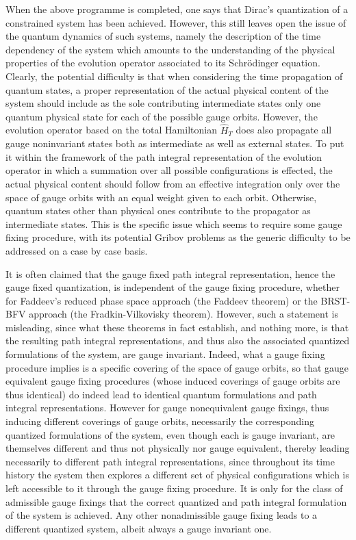 \documentclass[a4paper,11pt]{article}
\begin{document}
When the above programme is completed, one says that Dirac's quantization
of a constrained system has been achieved. However, this still leaves
open the issue of the quantum dynamics of such systems, namely the
description of the time dependency of the system which amounts to the
understanding of the physical properties of the evolution operator
associated to its Schr\"odinger equation. Clearly, the potential
difficulty is that when considering the time propagation of quantum
states, a proper representation of the actual physical content of
the system should include as the sole contributing intermediate states 
only one quantum physical state for each of the possible gauge orbits. 
However, the evolution operator based on the total Hamiltonian $\hat{H}_T$ 
does also propagate all gauge noninvariant states both as intermediate as 
well as external states. To put it within the framework of the path integral 
representation of the evolution operator in which a summation over
all possible configurations is effected, the actual physical content
should follow from an effective integration only over the space of
gauge orbits with an equal weight given to each orbit. Otherwise,
quantum states other than physical ones contribute to the propagator
as intermediate states. This is the specific issue which seems to require
some gauge fixing procedure, with its potential Gribov problems as
the generic difficulty to be addressed on a case by case basis.

It is often claimed that the gauge fixed path integral representation,
hence the gauge fixed quantization, is independent of the gauge fixing
procedure, whether for Faddeev's reduced phase space approach (the Faddeev
theorem\cite{JG1,Fad}) or the BRST-BFV approach (the Fradkin-Vilkovisky 
theorem\cite{JG1,BFV1}). However, such a statement is 
misleading,\cite{JG1,JG4,JG5} since what these theorems in
fact establish, and nothing more, is that the resulting path integral 
representations, and thus also the associated quantized formulations of 
the system, are gauge invariant. Indeed, what a gauge fixing procedure 
implies is a specific covering of the space of gauge orbits, 
so that gauge equi\-va\-lent gauge fixing procedures (whose induced coverings 
of gauge orbits are thus identical) do indeed lead to identical quantum 
formulations and path integral representations. However for gauge 
nonequivalent gauge fixings, thus inducing different coverings of gauge 
orbits, necessarily the corresponding quantized formulations of the system, 
even though each is gauge invariant, are themselves different and thus not 
physically nor gauge equivalent, thereby leading necessarily to different 
path integral representations, since throughout its time history the system
then explores a different set of physical configurations which is left
accessible to it through the gauge fixing procedure. It is only for the 
class of admissible gauge fixings that the correct quantized and path 
integral formulation of the system is achieved. Any other nonadmissible 
gauge fixing leads to a different quantized system, albeit always a gauge 
invariant one.
\end{document}
